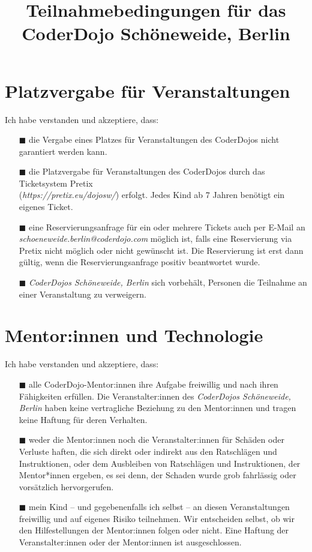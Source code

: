 \documentclass{coderdojoschoeneweide}
\title{Teilnahmebedingungen für das CoderDojo Schöneweide, Berlin}
\date{}
\begin{document}
	\maketitle

	\begin{Form}

		\section*{Platzvergabe für Veranstaltungen}

		Ich habe verstanden und akzeptiere, dass:

		\begin{itemize}
			\item[$\blacksquare$] die Vergabe eines Platzes für Veranstaltungen des CoderDojos nicht garantiert werden kann.
			\item[$\blacksquare$] die Platzvergabe für Veranstaltungen des CoderDojos durch das Ticketsystem Pretix \\(\textit{https://pretix.eu/dojosw/}) erfolgt. Jedes Kind ab 7 Jahren benötigt ein eigenes Ticket.
			\item[$\blacksquare$] eine Reservierungsanfrage für ein oder mehrere Tickets auch per E-Mail an \textit{schoeneweide.berlin@coderdojo.com} möglich ist, falls eine Reservierung via Pretix nicht möglich oder nicht gewünscht ist. Die Reservierung ist erst dann gültig, wenn die Reservierungsanfrage positiv beantwortet wurde.
			\item[$\blacksquare$] \textit{CoderDojos Schöneweide, Berlin} sich vorbehält, Personen die Teilnahme an einer Veranstaltung zu verweigern.
		\end{itemize}

		\section*{Mentor:innen und Technologie}

		Ich habe verstanden und akzeptiere, dass:

		\begin{itemize}
			\item[$\blacksquare$] alle CoderDojo-Mentor:innen ihre Aufgabe freiwillig und nach ihren Fähigkeiten erfüllen.
			Die Veranstalter:innen des \textit{CoderDojos Schöneweide, Berlin} haben keine vertragliche Beziehung zu den Mentor:innen und tragen keine Haftung für deren Verhalten.
			\item[$\blacksquare$] weder die Mentor:innen noch die Veranstalter:innen für Schäden oder Verluste haften, die sich direkt oder indirekt aus den Ratschlägen und Instruktionen, oder dem Ausbleiben von Ratschlägen und Instruktionen, der Mentor*innen ergeben, es sei denn, der Schaden wurde grob fahrlässig oder vorsätzlich hervorgerufen.
			\item[$\blacksquare$] mein Kind – und gegebenenfalls ich selbst – an diesen Veranstaltungen freiwillig und auf eigenes Risiko teilnehmen.
			Wir entscheiden selbst, ob wir den Hilfestellungen der Mentor:innen folgen oder nicht.
			Eine Haftung der Veranstalter:innen oder der Mentor:innen ist ausgeschlossen.
		\end{itemize}


\end{Form}
\end{document}
